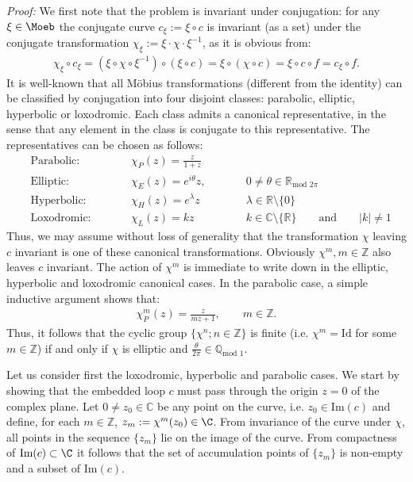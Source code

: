 {\it Proof:}
We first note that the problem is invariant under conjugation:
for any  $\xi \in \Moeb$ the conjugate curve $c_{\xi} := 
\xi \circ c$ is invariant (as a set) under
the conjugate transformation $\chi_\xi := \xi \cdot \chi \cdot \xi^{-1}$, 
as it is obvious from:
\begin{align*}
\chi_\xi \circ c_{\xi} = 
(\xi \circ \chi \circ \xi^{-1} ) \circ (\xi \circ c ) =
\xi \circ (\chi \circ c) = \xi \circ c \circ f = c_{\xi} \circ f.
\end{align*}
It is well-known that 
all M\"obius transformations (different from the identity) can be
classified by conjugation into four 
disjoint classes:
parabolic, elliptic, hyperbolic or loxodromic. Each class admits
a canonical representative, in the sense that any element in the class
is conjugate to this representative. The representatives can be chosen as
follows:
\begin{align}
& \mbox{Parabolic:} \quad \quad & & \chi_P(z)= \frac{z}{1+z} &&  \label{list} \\
& \mbox{Elliptic:} \quad \quad & & \chi_E(z)=   e^{i \theta} z, \quad \quad
&&0 \neq \theta \in \mathbb{R}_{\mbox{mod } 2 \pi} \nonumber \\
& \mbox{Hyperbolic:} \quad \quad & & \chi_H(z)=  e^{\lambda} z \quad \quad 
&& \lambda \in 
\mathbb{R} \setminus \{ 0 \} \nonumber \\
& \mbox{Loxodromic:} \quad \quad & & \chi_L(z)=   k z \quad \quad && k \in \mathbb{C}
\setminus \{ \mathbb{R} \} \quad \quad \mbox{and} \quad \quad |k| \neq 1
\nonumber 
\end{align}
Thus, we may assume without loss of generality
that the transformation $\chi$ leaving $c$
invariant is one of these canonical
transformations. Obviously $\chi^m, m \in \mathbb{Z}$ also leaves $c$ invariant.
The action of $\chi^m$ is immediate to write down in the elliptic,
hyperbolic and loxodromic canonical cases.
In the parabolic case, a simple inductive argument
shows that:
\begin{align*}
\chi_P^m (z ) = \frac{z}{m z+1}, \quad \quad m \in \mathbb{Z}.
\end{align*} 
Thus, it follows
that  the cyclic group $\{ \chi^n ; n \in \mathbb{Z} \}$ is finite 
(i.e. $\chi^m = \mbox{Id}$ for some $m \in \mathbb{Z}$)
if and only if $\chi$ is elliptic
and $\frac{\theta}{2\pi} \in \mathbb{Q}_{\mbox{mod } 1}$.

Let us consider first the loxodromic, hyperbolic and parabolic cases. We start
by showing that  the embedded loop $c$ must pass through the
origin $z=0$  of the complex plane. Let $0 \neq z_0 \in \mathbb{C}$ be any point on the curve, i.e. $z_0 \in \mbox{Im} (c)$
and define, for each $m \in \mathbb{Z}$, $z_m := 
\chi^m (z_0) \in \C$. From invariance of the
curve under $\chi$, all points in the sequence $\{ z_m \}$ lie on
the image of the curve. From compactness of $\mbox{Im} (c) \subset \C$
it follows that the set of accumulation points of $\{ z_m\}$ is non-empty
and a subset of $\mbox{Im}(c)$. 



